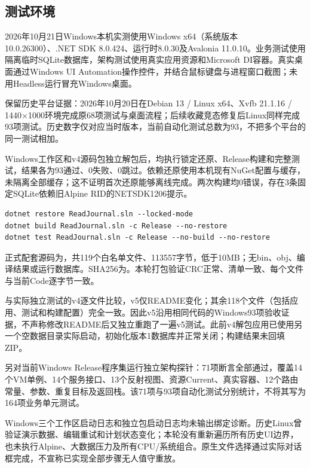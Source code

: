 \documentclass[UTF8,a4paper,11pt,fontset=none]{ctexart}
\begin{document}
\subsection{测试环境}
2026年10月21日Windows本机实测使用Windows x64（系统版本10.0.26300）、.NET SDK 8.0.424、运行时8.0.30及Avalonia 11.0.10。业务测试使用隔离临时SQLite数据库，架构测试使用真实应用资源和Microsoft DI容器。真实桌面通过Windows UI Automation操作控件，并结合鼠标键盘与进程窗口截图；未用Headless运行冒充Windows桌面。

保留历史平台证据：2026年10月20日在Debian 13 / Linux x64、Xvfb 21.1.16 / 1440×1000环境完成原68项测试与桌面流程；后续收藏竞态修复后Linux同样完成93项测试。历史数字仅对应当时版本，当前自动化测试总数为93，不把多个平台的同一测试相加。

Windows工作区和v4源码包独立解包后，均执行锁定还原、Release构建和完整测试，结果各为93通过、0失败、0跳过。依赖还原使用本机现有NuGet配置与缓存，未隔离全部缓存；这不证明首次还原能够离线完成。两次构建均0错误，存在3条固定SQLite依赖旧Alpine RID的NETSDK1206提示。
\begin{Verbatim}[fontsize=\small,breaklines=true]
dotnet restore ReadJournal.sln --locked-mode
dotnet build ReadJournal.sln -c Release --no-restore
dotnet test ReadJournal.sln -c Release --no-build --no-restore
\end{Verbatim}

正式配套源码为，共119个白名单文件、113557字节，低于10MB；无bin、obj、编译结果或运行数据库。SHA256为。本轮打包验证CRC正常、清单一致、每个文件与当前Code逐字节一致。

与实际独立测试的v4逐文件比较，v5仅README变化；其余118个文件（包括应用、测试和构建配置）完全一致。因此v5沿用相同代码的Windows93项验收证据，不声称修改README后又独立重跑了一遍v5测试。此前v4解包应用已使用另一个空数据目录实际启动，初始化版本1数据库并正常关闭；构建结果未回填ZIP。

另对当前Windows Release程序集运行独立架构探针：71项断言全部通过，覆盖14个VM单例、14个服务接口、13个反射视图、资源Current、真实容器、12个路由常量、参数、重复目标及返回栈。该71项与93项自动化测试分别统计，不将其写为164项业务单元测试。

Windows三个工作区启动日志和独立包启动日志均未输出绑定诊断。历史Linux曾验证演示数据、编辑重试和计划状态变化；本轮没有重新遍历所有历史UI边界，也未执行Alpine、大数据压力及所有CPU/系统组合。原生文件选择通过实际对话框完成，不宣称已实现全部步骤无人值守重放。
\clearpage
\end{document}
